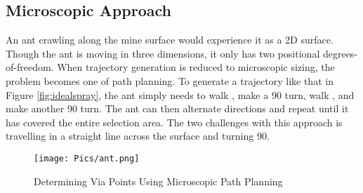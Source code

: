 \subsection{Microscopic Approach}

An ant crawling along the mine surface would experience it as a 2D surface. Though the ant is moving in three dimensions, it only has two positional degrees-of-freedom. When trajectory generation is reduced to microscopic sizing, the problem becomes one of path planning. To generate a trajectory like that in Figure \ref{fig:idealspray}, the ant simply needs to walk , make a 90\degree\hspace{0pt} turn, walk , and make another 90\degree\hspace{0pt} turn. The ant can then alternate directions and repeat until it has covered the entire selection area. The two challenges with this approach is travelling in a straight line across the surface and turning 90\degree\hspace{0pt}.\\

\begin{figure}[h!]
    \centering
    \texttt{[image: Pics/ant.png]}
    \caption{Determining Via Points Using Microscopic Path Planning}
    \label{fig:ant}
\end{figure}

